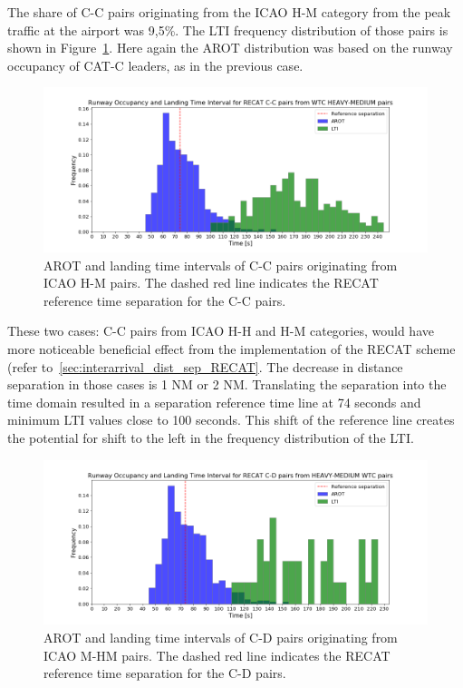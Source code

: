  The share of C-C pairs originating from the ICAO H-M category from the peak traffic at the airport was 9,5\%.  The LTI frequency distribution of those pairs is shown in Figure~\ref{fig:CC_from_HM_pairs_time_sep}. Here again the AROT distribution was based on the runway occupancy of CAT-C leaders, as in the previous case. 
\begin{figure}[h]
    \centering
    \includegraphics[width=1\textwidth]{graphics/fig_CC_from_HM_pairs_time_sep.png}
    \caption[AROT and LTI of C-C pairs originating from ICAO H-M pairs]{AROT and landing time intervals of C-C pairs originating from ICAO H-M pairs. The dashed red line indicates the RECAT reference time separation for the C-C pairs.}
    \label{fig:CC_from_HM_pairs_time_sep}
\end{figure}
 These two cases: C-C pairs from ICAO H-H and H-M categories, would have more noticeable beneficial effect from the implementation of the RECAT scheme (refer to~\ref{sec:interarrival_dist_sep_RECAT}. The decrease in distance separation in those cases is 1 NM or 2 NM. Translating the separation into the time domain resulted in a separation reference time line at 74 seconds and minimum LTI values close to 100 seconds. This shift of the reference line creates the potential for shift to the left in the frequency distribution of the LTI.
 \begin{figure}[h]
    \centering
    \includegraphics[width=1\textwidth]{graphics/fig_CD_from_HM_pairs_time_sep.png}
    \caption[AROT and LTI of C-D pairs originating from ICAO M-M pairs]{AROT and landing time intervals of C-D pairs originating from ICAO M-HM pairs. The dashed red line indicates the RECAT reference time separation for the C-D pairs.}
    \label{fig:CD_from_HM_pairs_time_sep}
\end{figure}
